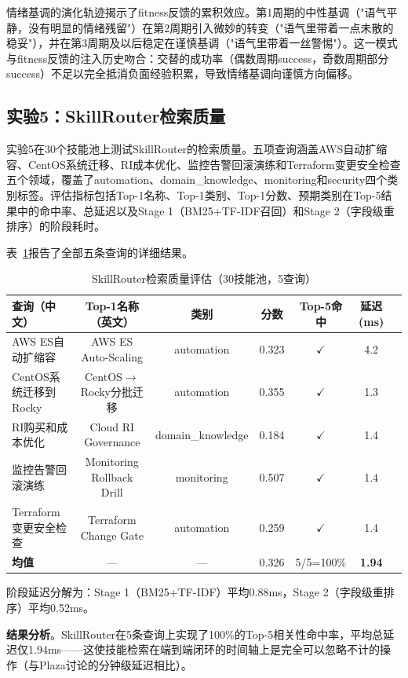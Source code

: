 \documentclass[12pt,a4paper]{ctexart}
\begin{document}
情绪基调的演化轨迹揭示了fitness反馈的累积效应。第1周期的中性基调（"语气平静，没有明显的情绪残留"）在第2周期引入微妙的转变（"语气里带着一点未散的稳妥"），并在第3周期及以后稳定在谨慎基调（"语气里带着一丝警惕"）。这一模式与fitness反馈的注入历史吻合：交替的成功率（偶数周期success，奇数周期部分success）不足以完全抵消负面经验积累，导致情绪基调向谨慎方向偏移。

\subsection{实验5：SkillRouter检索质量}

实验5在30个技能池上测试SkillRouter的检索质量。五项查询涵盖AWS自动扩缩容、CentOS系统迁移、RI成本优化、监控告警回滚演练和Terraform变更安全检查五个领域，覆盖了automation、domain\_knowledge、monitoring和security四个类别标签。评估指标包括Top-1名称、Top-1类别、Top-1分数、预期类别在Top-5结果中的命中率、总延迟以及Stage 1（BM25+TF-IDF召回）和Stage 2（字段级重排序）的阶段耗时。

表~\ref{tab:router}报告了全部五条查询的详细结果。

\begin{table}[H]
\centering
\caption{SkillRouter检索质量评估（30技能池，5查询）}
\label{tab:router}
\renewcommand{\arraystretch}{1.15}
\begin{tabular}{lcccccc}
\toprule
查询（中文） & Top-1名称（英文） & 类别 & 分数 & Top-5命中 & 延迟(ms) \\
\midrule
AWS ES自动扩缩容 & AWS ES Auto-Scaling & automation & 0.323 & $\checkmark$ & 4.2 \\
CentOS系统迁移到Rocky & CentOS$\to$Rocky分批迁移 & automation & 0.355 & $\checkmark$ & 1.3 \\
RI购买和成本优化 & Cloud RI Governance & domain\_knowledge & 0.184 & $\checkmark$ & 1.4 \\
监控告警回滚演练 & Monitoring Rollback Drill & monitoring & 0.507 & $\checkmark$ & 1.4 \\
Terraform变更安全检查 & Terraform Change Gate & automation & 0.259 & $\checkmark$ & 1.4 \\
\midrule
\textbf{均值} & — & — & 0.326 & 5/5=100\% & \textbf{1.94} \\
\bottomrule
\end{tabular}
\end{table}

阶段延迟分解为：Stage 1（BM25+TF-IDF）平均0.88ms，Stage 2（字段级重排序）平均0.52ms。

\textbf{结果分析}。SkillRouter在5条查询上实现了100\%的Top-5相关性命中率，平均总延迟仅1.94ms——这使技能检索在端到端闭环的时间轴上是完全可以忽略不计的操作（与Plaza讨论的分钟级延迟相比）。
\end{document}
